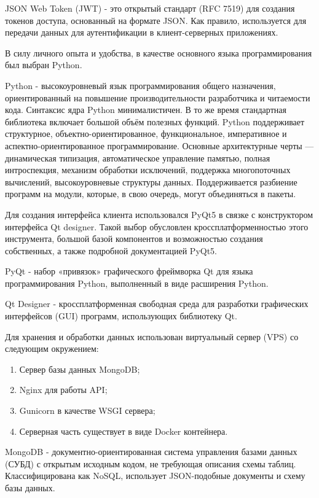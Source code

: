 \documentclass[14pt, a4paper]{extarticle}
\begin{document}
    JSON Web Token (JWT) - это открытый стандарт (RFC 7519) для создания токенов доступа, основанный на формате JSON. Как правило, используется для передачи данных для аутентификации в клиент-серверных приложениях.

    В силу личного опыта и удобства, в качестве основного языка программирования был выбран Python.

    Python - высокоуровневый язык программирования общего назначения, ориентированный на повышение производительности разработчика и читаемости кода. Синтаксис ядра Python минималистичен. В то же время стандартная библиотека включает большой объём полезных функций. Python поддерживает структурное, объектно-ориентированное, функциональное, императивное и аспектно-ориентированное программирование. Основные архитектурные черты — динамическая типизация, автоматическое управление памятью, полная интроспекция, механизм обработки исключений, поддержка многопоточных вычислений, высокоуровневые структуры данных. Поддерживается разбиение программ на модули, которые, в свою очередь, могут объединяться в пакеты.

    Для создания интерфейса клиента использовался PyQt5 в связке с конструктором интерфейса Qt designer. Такой выбор обусловлен кроссплатформенностью этого инструмента, большой базой компонентов и возможностью создания собственных, а также подробной документацией PyQt5.

    PyQt - набор «привязок» графического фреймворка Qt для языка программирования Python, выполненный в виде расширения Python.

    Qt Designer - кроссплатформенная свободная среда для разработки графических интерфейсов (GUI) программ, использующих библиотеку Qt.

    Для хранения и обработки данных использован виртуальный сервер (VPS) со следующим окружением:
    \begin{enumerate} 
        \item Сервер базы данных MongoDB;
        \item Nginx для работы API;
        \item Gunicorn в качестве WSGI сервера;
        \item Серверная часть существует в виде Docker контейнера.
    \end{enumerate}
    MongoDB - документно-ориентированная система управления базами данных (СУБД) с открытым исходным кодом, не требующая описания схемы таблиц. Классифицирована как NoSQL, использует JSON-подобные документы и схему базы данных.
\end{document}
